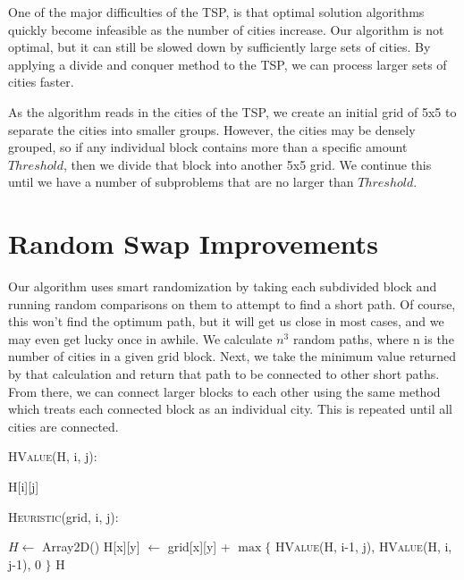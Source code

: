 \documentclass[12pt,letterpaper]{article}
\begin{document}
One of the major difficulties of the TSP, is that optimal solution algorithms quickly become infeasible as the number of cities increase. Our algorithm is not optimal, but it can still be slowed down by sufficiently large sets of cities. By applying a divide and conquer method to the TSP, we can process larger sets of cities faster.

As the algorithm reads in the cities of the TSP, we create an initial grid of 5x5 to separate the cities into smaller groups. However, the cities may be densely grouped, so if any individual block contains more than a specific amount $Threshold$, then we divide that block into another 5x5 grid. We continue this until we have a number of subproblems that are no larger than $Threshold$. 

\section*{Random Swap Improvements}
Our algorithm uses smart randomization by taking each subdivided block and running random comparisons on them to attempt to find a short path. Of course, this won't find the optimum path, but it will get us close in most cases, and we may even get lucky once in awhile. We calculate $n^3$ random paths, where n is the number of cities in a given grid block. Next, we take the minimum value returned by that calculation and return that path to be connected to other short paths. From there, we can connect larger blocks to each other using the same method which treats each connected block as an individual city. This is repeated until all cities are connected.

\textsc{HValue}(H, i, j):
\begin{algorithmic}
    \State {}
\Else
    \State \Return H[i][j]
\EndIf
\end{algorithmic}

\textsc{Heuristic}(grid, i, j):
\begin{algorithmic}
\State $H \gets$ Array2D()
        \State H[x][y] $\gets$ grid[x][y] + $\max \{$ \textsc{HValue}(H, i-1, j), \textsc{HValue}(H, i, j-1), 0  $\}$
    \EndFor
\EndFor
\State \Return H
\end{algorithmic}

\newpage
\end{document}
